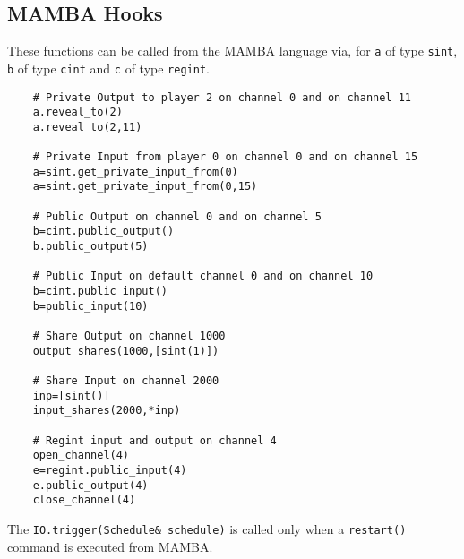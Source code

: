 \subsection{MAMBA Hooks}
These functions can be called from the MAMBA language via,
for \verb+a+ of type \verb+sint+, \verb+b+ of type \verb+cint+
and \verb+c+ of type \verb+regint+.
\begin{verbatim}
    # Private Output to player 2 on channel 0 and on channel 11
    a.reveal_to(2)
    a.reveal_to(2,11)

    # Private Input from player 0 on channel 0 and on channel 15
    a=sint.get_private_input_from(0)
    a=sint.get_private_input_from(0,15)

    # Public Output on channel 0 and on channel 5
    b=cint.public_output()
    b.public_output(5)

    # Public Input on default channel 0 and on channel 10
    b=cint.public_input()
    b=public_input(10)

    # Share Output on channel 1000
    output_shares(1000,[sint(1)])

    # Share Input on channel 2000
    inp=[sint()]
    input_shares(2000,*inp)

    # Regint input and output on channel 4
    open_channel(4)
    e=regint.public_input(4)
    e.public_output(4)
    close_channel(4)
\end{verbatim}
The \verb+IO.trigger(Schedule& schedule)+ is called only when a \verb+restart()+ command
is executed from MAMBA.

